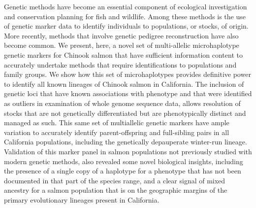 

Genetic methods have become an essential component of ecological investigation
and conservation planning for fish and wildlife. Among these methods is the use
of genetic marker data to identify individuals to
populations, or stocks, of origin. More recently, methods that involve genetic
pedigree reconstruction have also become common. We present, here, a novel set of
multi-allelic microhaplotype genetic markers for Chinook salmon that have sufficient information
content to accurately undertake methods that require identifications
to populations and family groups. We show how this set of microhaplotypes
provides definitive power to identify all known lineages of Chinook salmon in
California. The inclusion of genetic loci that have known associations with phenotype
and that were identified as outliers in examination of whole genome sequence data,
allows resolution of stocks that are not genetically differentiated but
are phenotypically distinct and managed as such. 
This same set of multiallelic genetic markers have ample variation to
accurately identify parent-offspring and full-sibling
pairs in all California populations, including the genetically depauperate winter-run
lineage.
Validation of this marker panel in salmon populations not previously studied with
modern genetic methods, also revealed some novel biological insights, including
the presence of a single copy of a haplotype for a phenotype that has not
been documented in that part of the species range, and a clear signal of mixed
ancestry for a salmon population that is on the geographic margins of the 
primary evolutionary lineages present in California.
